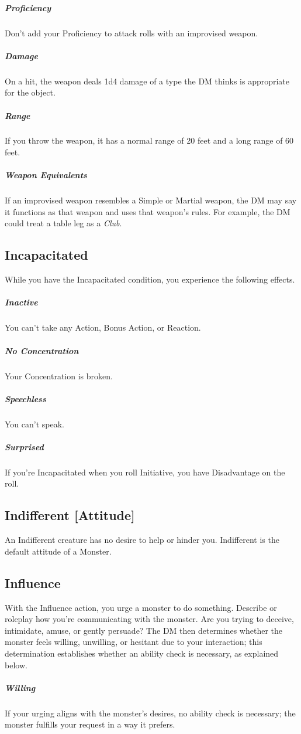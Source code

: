 \documentclass[10pt,a4paper,twoside,bg=print,twocolumn,openany,nodeprecatedcode]{dndarticle}
\begin{document}
\subparagraph{Proficiency}
Don't add your Proficiency to attack rolls with an improvised weapon.

\subparagraph{Damage}
On a hit, the weapon deals 1d4 damage of a type the DM thinks is appropriate for the object.

\subparagraph{Range}
If you throw the weapon, it has a normal range of 20 feet and a long range of 60 feet.

\subparagraph{Weapon Equivalents}
If an improvised weapon resembles a Simple or Martial weapon, the DM may say it functions as that weapon and uses that weapon's rules. For example, the DM could treat a table leg as a \textit{Club}.

\subsection{Incapacitated}
While you have the Incapacitated condition, you experience the following effects.

\subparagraph{Inactive}
You can't take any Action, Bonus Action, or Reaction.

\subparagraph{No Concentration}
Your Concentration is broken.

\subparagraph{Speechless}
You can't speak.

\subparagraph{Surprised}
If you're Incapacitated when you roll Initiative, you have Disadvantage on the roll.

\subsection{Indifferent [Attitude]}
An Indifferent creature has no desire to help or hinder you. Indifferent is the default attitude of a Monster.

\subsection{Influence}
With the Influence action, you urge a monster to do something. Describe or roleplay how you're communicating with the monster. Are you trying to deceive, intimidate, amuse, or gently persuade? The DM then determines whether the monster feels willing, unwilling, or hesitant due to your interaction; this determination establishes whether an ability check is necessary, as explained below.

\subparagraph{Willing}
If your urging aligns with the monster's desires, no ability check is necessary; the monster fulfills your request in a way it prefers.
\end{document}
